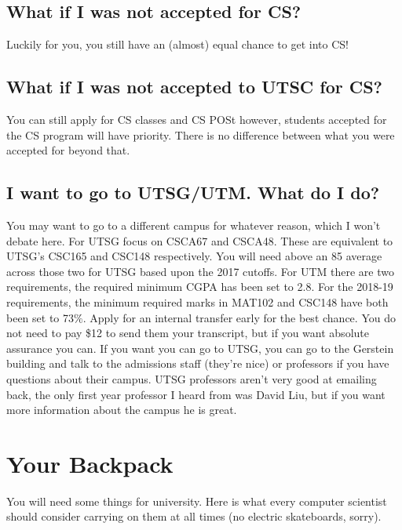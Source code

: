 \documentclass[11pt]{article}
\begin{document}
\subsection{What if I was not accepted for CS?} Luckily for you, you still have an (almost) equal chance to get into CS!
\subsection{What if I was not accepted to UTSC for CS?} You can still apply for CS classes and CS POSt however, students accepted for the CS program will have priority. There is no difference between what you were accepted for beyond that.\par
\subsection{I want to go to UTSG/UTM. What do I do?} You may want to go to a different campus for whatever reason, which I won't debate here. For UTSG focus on CSCA67 and CSCA48. These are equivalent to UTSG's CSC165 and CSC148 respectively. You will need above an 85 average across those two for UTSG based upon the 2017 cutoffs. For UTM there are two requirements, the required minimum CGPA has been set to 2.8. For the 2018-19 requirements, the minimum required marks in MAT102 and CSC148 have both been set to 73$\%$. Apply for an internal transfer early for the best chance. You do not need to pay \$12 to send them your transcript, but if you want absolute assurance you can. If you want you can go to UTSG, you can go to the Gerstein building and talk to the admissions staff (they're nice) or professors if you have questions about their campus. UTSG professors aren't very good at emailing back, the only first year professor I heard from was David Liu, but if you want more information about the campus he is great.\par


\section{Your Backpack}
You will need some things for university. Here is what every computer scientist should consider carrying on them at all times (no electric skateboards, sorry).
\end{document}
